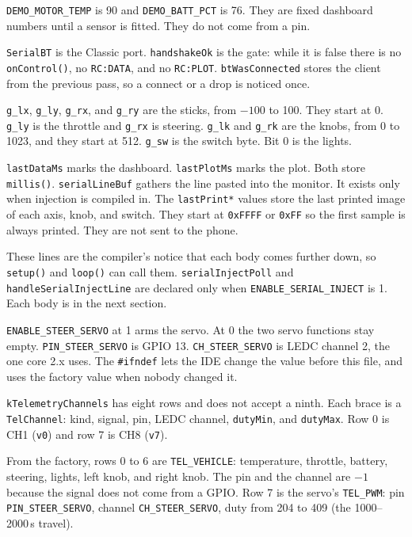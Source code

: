 \documentclass[11pt,a4paper]{article}
\newcommand{\nm}[1]{\textcolor{ArduinoName}{\texttt{#1}}}
\newcommand{\fnm}[1]{\textcolor{ArduinoFunc}{\texttt{#1}}}
\newcommand{\typ}[1]{\textcolor{ArduinoType}{\texttt{#1}}}
\newcommand{\kw}[1]{\textcolor{ArduinoControl}{\texttt{#1}}}
\newcommand{\str}[1]{\textcolor{ArduinoString}{\texttt{#1}}}
\newcommand{\sketchfile}{../../../ESP32_noCam/Classic_Simple/TeleCon_Classic_Simple/TeleCon_Classic_Simple.ino}
\newcommand{\inosnippet}[2]{%
  \par\addvspace{1.35em}%
}
\begin{document}
\nm{DEMO\_MOTOR\_TEMP} is 90 and \nm{DEMO\_BATT\_PCT} is 76.
They are fixed dashboard numbers until a sensor is fitted.
They do not come from a pin.

\inosnippet{47}{70}

\nm{SerialBT} is the Classic port. \nm{handshakeOk} is the gate:
while it is false there is no \fnm{onControl()}, no \str{RC:DATA},
and no \str{RC:PLOT}. \nm{btWasConnected} stores the client from
the previous pass, so a connect or a drop is noticed once.

\nm{g\_lx}, \nm{g\_ly}, \nm{g\_rx}, and \nm{g\_ry} are the
sticks, from $-100$ to 100. They start at 0. \nm{g\_ly} is the
throttle and \nm{g\_rx} is steering. \nm{g\_lk} and
\nm{g\_rk} are the knobs, from 0 to 1023, and they start at 512.
\nm{g\_sw} is the switch byte. Bit 0 is the lights.

\nm{lastDataMs} marks the dashboard.
\nm{lastPlotMs} marks the plot.
Both store \fnm{millis()}.
\nm{serialLineBuf} gathers the line pasted into the monitor.
It exists only when injection is compiled in.
The \nm{lastPrint*} values store the last printed image of each
axis, knob, and switch. They start at \typ{0xFFFF} or \typ{0xFF}
so the first sample is always printed. They are not sent to the phone.

\inosnippet{72}{84}

These lines are the compiler's notice that each body comes further
down, so \fnm{setup()} and \fnm{loop()} can call them.
\fnm{serialInjectPoll} and \fnm{handleSerialInjectLine} are
declared only when \nm{ENABLE\_SERIAL\_INJECT} is 1. Each body is
in the next section.

\inosnippet{87}{98}

\nm{ENABLE\_STEER\_SERVO} at 1 arms the servo.
At 0 the two servo functions stay empty.
\nm{PIN\_STEER\_SERVO} is GPIO 13.
\nm{CH\_STEER\_SERVO} is LEDC channel 2, the one core 2.x uses.
The \kw{\#ifndef} lets the IDE change the value before this file,
and uses the factory value when nobody changed it.

\inosnippet{100}{114}

\nm{kTelemetryChannels} has eight rows and does not accept a ninth.
Each brace is a \nm{TelChannel}: kind, signal, pin, LEDC channel,
\nm{dutyMin}, and \nm{dutyMax}. Row 0 is CH1 (\str{v0}) and
row 7 is CH8 (\str{v7}).

From the factory, rows 0 to 6 are \nm{TEL\_VEHICLE}: temperature,
throttle, battery, steering, lights, left knob, and right knob.
The pin and the channel are $-1$ because the signal does not come
from a GPIO. Row 7 is the servo's \nm{TEL\_PWM}: pin
\nm{PIN\_STEER\_SERVO}, channel \nm{CH\_STEER\_SERVO}, duty from
204 to 409 (the 1000--2000\,\textmu s travel).
\end{document}
